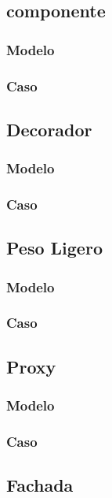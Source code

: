 \newpage

\subsection{componente}
\subsubsection{Modelo}
\newpage
\subsubsection{Caso}
\newpage

\subsection{Decorador}
\subsubsection{Modelo}
\newpage
\subsubsection{Caso}
\newpage

\subsection{Peso Ligero}
\subsubsection{Modelo}
\newpage
\subsubsection{Caso}
\newpage

\subsection{Proxy}
\subsubsection{Modelo}
\newpage
\subsubsection{Caso}
\newpage

\subsection{Fachada}
